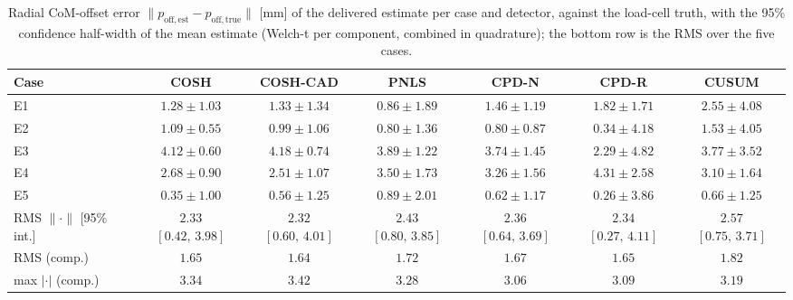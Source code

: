 \begin{table}[t]
\caption{Radial CoM-offset error
$\|p_{\mathrm{off,est}} - p_{\mathrm{off,true}}\|$
[mm] of the delivered estimate per case and detector,
against the load-cell truth, with the 95\% confidence
half-width of the mean estimate (Welch-t per component,
combined in quadrature); the bottom row is the RMS over
the five cases.}
\label{tab:offset_error}
\centering\small
\begin{tabular}{@{}lcccccc@{}}
\toprule
Case & COSH & COSH-CAD & PNLS & CPD-N & CPD-R & CUSUM\\
\midrule
E1 & $1.28 \pm 1.03$ & $1.33 \pm 1.34$ & $0.86 \pm 1.89$ & $1.46 \pm 1.19$ & $1.82 \pm 1.71$ & $2.55 \pm 4.08$\\
E2 & $1.09 \pm 0.55$ & $0.99 \pm 1.06$ & $0.80 \pm 1.36$ & $0.80 \pm 0.87$ & $0.34 \pm 4.18$ & $1.53 \pm 4.05$\\
E3 & $4.12 \pm 0.60$ & $4.18 \pm 0.74$ & $3.89 \pm 1.22$ & $3.74 \pm 1.45$ & $2.29 \pm 4.82$ & $3.77 \pm 3.52$\\
E4 & $2.68 \pm 0.90$ & $2.51 \pm 1.07$ & $3.50 \pm 1.73$ & $3.26 \pm 1.56$ & $4.31 \pm 2.58$ & $3.10 \pm 1.64$\\
E5 & $0.35 \pm 1.00$ & $0.56 \pm 1.25$ & $0.89 \pm 2.01$ & $0.62 \pm 1.17$ & $0.26 \pm 3.86$ & $0.66 \pm 1.25$\\
\midrule
RMS $\|\cdot\|$ [95\% int.] & $2.33$ $[0.42,\,3.98]$ & $2.32$ $[0.60,\,4.01]$ & $2.43$ $[0.80,\,3.85]$ & $2.36$ $[0.64,\,3.69]$ & $2.34$ $[0.27,\,4.11]$ & $2.57$ $[0.75,\,3.71]$\\
RMS (comp.) & $1.65$ & $1.64$ & $1.72$ & $1.67$ & $1.65$ & $1.82$\\
max $|\cdot|$ (comp.) & $3.34$ & $3.42$ & $3.28$ & $3.06$ & $3.09$ & $3.19$\\
\bottomrule
\end{tabular}
\end{table}
